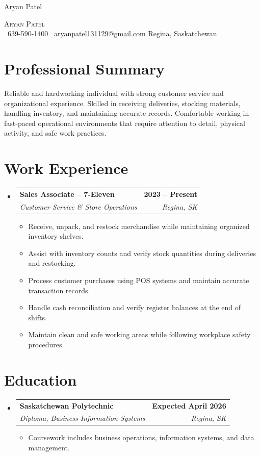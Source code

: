 \documentclass[letterpaper,12pt]{article}
\makeatletter
\newcommand{\resumeItem}[1]{\item #1}
\newcommand{\resumeSubheading}[4]{
\vspace{-2pt}\item
\begin{tabular*}{1.0\textwidth}[t]{l@{\extracolsep{\fill}}r}
\textbf{#1} & \textbf{#2} \\
\textit{#3} & \textit{#4} \\
\end{tabular*}\vspace{-5pt}
}
\newcommand{\resumeSubHeadingListStart}{\begin{itemize}[leftmargin=0in,label={}]}
\newcommand{\resumeSubHeadingListEnd}{\end{itemize}}
\newcommand{\resumeItemListStart}{\begin{itemize}[itemsep=2pt]}
\newcommand{\resumeItemListEnd}{\end{itemize}\vspace{-5pt}}
\makeatother
\begin{document}
Aryan Patel

\newpage


\begin{center}
{\Large \scshape Aryan Patel} \\[2mm]
\faPhone\ 639-590-1400 \quad
\faEnvelope\ \href{mailto:aryanpatel131129@gmail.com}{aryanpatel131129@gmail.com} \quad
Regina, Saskatchewan
\end{center}

\section{Professional Summary}

Reliable and hardworking individual with strong customer service and organizational experience. Skilled in receiving deliveries, stocking materials, handling inventory, and maintaining accurate records. Comfortable working in fast-paced operational environments that require attention to detail, physical activity, and safe work practices.

\section{Work Experience}

\resumeSubHeadingListStart
\resumeSubheading
{Sales Associate -- 7-Eleven}{2023 -- Present}
{Customer Service \& Store Operations}{Regina, SK}
\resumeItemListStart
\resumeItem{Receive, unpack, and restock merchandise while maintaining organized inventory shelves.}
\resumeItem{Assist with inventory counts and verify stock quantities during deliveries and restocking.}
\resumeItem{Process customer purchases using POS systems and maintain accurate transaction records.}
\resumeItem{Handle cash reconciliation and verify register balances at the end of shifts.}
\resumeItem{Maintain clean and safe working areas while following workplace safety procedures.}
\resumeItemListEnd
\resumeSubHeadingListEnd

\section{Education}

\resumeSubHeadingListStart
\resumeSubheading
{Saskatchewan Polytechnic}{Expected April 2026}
{Diploma, Business Information Systems}{Regina, SK}
\resumeItemListStart
\resumeItem{Coursework includes business operations, information systems, and data management.}
\resumeItemListEnd
\resumeSubHeadingListEnd
\end{document}
